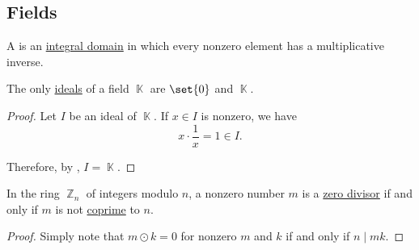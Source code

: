 \subsection{Fields}\label{subsec:fields}

\begin{definition}\label{def:field}
  A  is an \hyperref[def:integral_domain]{integral domain} in which every nonzero element has a multiplicative inverse.
\end{definition}

\begin{proposition}\label{thm:ideals_of_field}
  The only \hyperref[def:semiring_ideal]{ideals} of a field \( \BbbK \) are \( \set{ 0 } \) and \( \BbbK \).
\end{proposition}
\begin{proof}
  Let \( I \) be an ideal of \( \BbbK \). If \( x \in I \) is nonzero, we have
  \begin{equation*}
    x \cdot \frac 1 x = 1 \in I.
  \end{equation*}

  Therefore, by , \( I = \BbbK \).
\end{proof}

\begin{lemma}\label{thm:ring_of_integers_modulo_zero_divisors}
  In the ring \hyperref[thm:ring_of_integers_modulo]{\( \BbbZ_n \)} of integers modulo \( n \), a nonzero number \( m \) is a \hyperref[def:divisibility]{zero divisor} if and only if \( m \) is not \hyperref[def:coprime_numbers]{coprime} to \( n \).
\end{lemma}
\begin{proof}
  Simply note that \( m \odot k = 0 \) for nonzero \( m \) and \( k \) if and only if \( n \mid mk \).
\end{proof}

